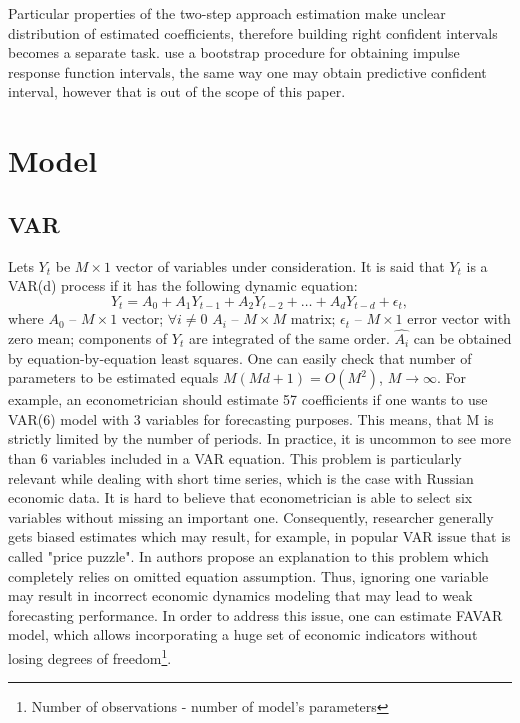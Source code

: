 \documentclass[a4paper, 14pt]{article}
\begin{document}
Particular properties of the two-step approach estimation make unclear distribution of estimated coefficients, therefore building right confident intervals becomes a separate task. \cite{bernanke2005measuring} use a bootstrap procedure for obtaining impulse response function intervals, the same way one may obtain predictive confident interval, however that is out of the scope of this paper.

\section{Model}
\subsection{VAR}
Lets $Y_t$ be $M\times 1$ vector of variables under consideration. It is said that $Y_t$ is a VAR(d) process if it has the following dynamic equation:
\begin{equation}
Y_t = A_0 + A_1 Y_{t-1} + A_2 Y_{t-2} + \dotso + A_d Y_{t-d} + \epsilon_t,
\end{equation}
where $A_0$ -- $M\times1$ vector; $\forall i\neq0$ $A_i$  -- $M\times M$ matrix; $\epsilon_t$ -- $M\times 1$ error vector with zero mean; components of $Y_t$ are integrated of the same order. $\hat{A_i}$ can be obtained by equation-by-equation least squares. One can easily check that number of parameters to be estimated equals $M(M d + 1) = O(M^2)$, $M \rightarrow \infty$. For example, an econometrician should estimate 57 coefficients if one wants to use VAR(6) model with 3 variables for forecasting purposes. This means, that M is strictly limited by the number of periods. In practice, it is uncommon to see more than 6 variables included in a VAR equation. This problem is particularly relevant while dealing with short time series, which is the case with Russian economic data. It is hard to believe that econometrician is able to select six variables without missing an important one. Consequently, researcher generally gets biased estimates which may result, for example, in popular VAR issue that is called "price puzzle". In \cite{bernanke2005measuring} authors propose an explanation to this problem which completely relies on omitted equation assumption. Thus, ignoring one variable may result in incorrect economic dynamics modeling that may lead to weak forecasting performance. In order to address this issue, one can estimate FAVAR model, which allows incorporating a huge set of economic indicators without losing degrees of freedom\footnote{Number of observations - number of model's parameters}.
\end{document}
